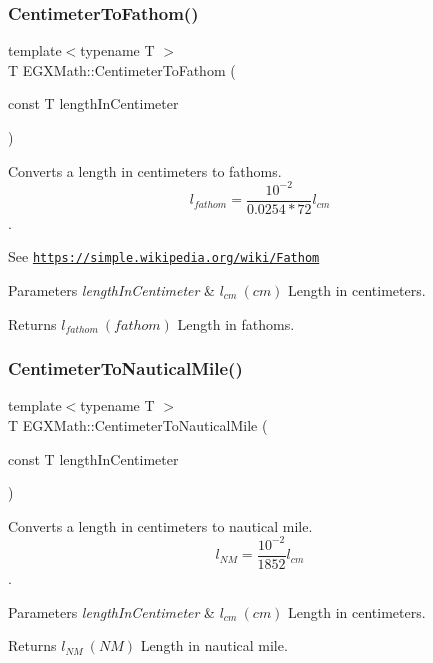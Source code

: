 \subsubsection{\texorpdfstring{Centimeter\+To\+Fathom()}{CentimeterToFathom()}}
{\footnotesize\ttfamily template$<$typename T $>$ \\
T E\+G\+X\+Math\+::\+Centimeter\+To\+Fathom (\begin{DoxyParamCaption}\item[{const T}]{length\+In\+Centimeter }\end{DoxyParamCaption})}



Converts a length in centimeters to fathoms. \[ l_{fathom}= \frac{10^{-2}}{0.0254 * 72} l_{cm} \]. 

See \href{https://simple.wikipedia.org/wiki/Fathom}{\tt https\+://simple.\+wikipedia.\+org/wiki/\+Fathom} 
\begin{DoxyParams}{Parameters}
{\em length\+In\+Centimeter} & $ l_{cm}\ (cm)$ Length in centimeters. \\
\hline
\end{DoxyParams}
\begin{DoxyReturn}{Returns}
$ l_{fathom}\ (fathom)$ Length in fathoms. 
\end{DoxyReturn}
\mbox{\label{group___e_g_x_math-_conversions-_length_conversions-_s_i-_centimeter-_nautical_ga65cf4453e28b375ee5c52389620939c6}} 
\subsubsection{\texorpdfstring{Centimeter\+To\+Nautical\+Mile()}{CentimeterToNauticalMile()}}
{\footnotesize\ttfamily template$<$typename T $>$ \\
T E\+G\+X\+Math\+::\+Centimeter\+To\+Nautical\+Mile (\begin{DoxyParamCaption}\item[{const T}]{length\+In\+Centimeter }\end{DoxyParamCaption})}



Converts a length in centimeters to nautical mile. \[ l_{NM}= \frac{10^{-2}}{1852} l_{cm} \]. 


\begin{DoxyParams}{Parameters}
{\em length\+In\+Centimeter} & $ l_{cm}\ (cm)$ Length in centimeters. \\
\hline
\end{DoxyParams}
\begin{DoxyReturn}{Returns}
$ l_{NM}\ (NM)$ Length in nautical mile. 
\end{DoxyReturn}
